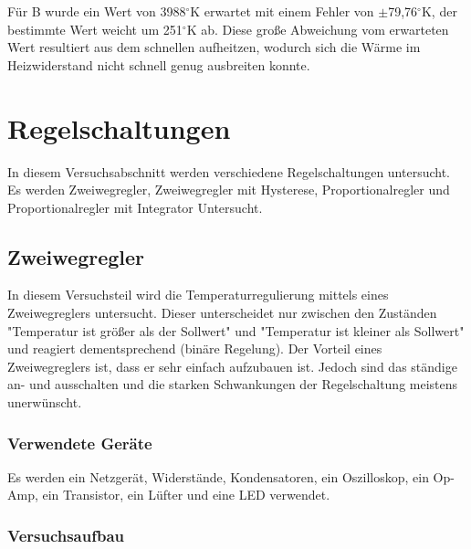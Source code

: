 \documentclass[12pt,a4paper]{article}
\begin{document}
Für B wurde ein Wert von 3988$^\circ$K erwartet mit einem Fehler von $\pm$79,76$^\circ$K, der bestimmte Wert weicht um 251$^\circ$K ab. Diese große Abweichung vom erwarteten Wert resultiert aus dem schnellen aufheitzen, wodurch sich die Wärme im Heizwiderstand nicht schnell genug ausbreiten konnte.


\section{Regelschaltungen}
In diesem Versuchsabschnitt werden verschiedene Regelschaltungen untersucht. Es werden Zweiwegregler, Zweiwegregler mit Hysterese, Proportionalregler und Proportionalregler mit Integrator Untersucht.

\subsection{Zweiwegregler}

In diesem Versuchsteil wird die Temperaturregulierung mittels eines Zweiwegreglers untersucht. Dieser unterscheidet nur zwischen den Zuständen "Temperatur ist größer als der Sollwert" und "Temperatur ist kleiner als Sollwert" und reagiert dementsprechend (binäre Regelung). Der Vorteil eines Zweiwegreglers ist, dass er sehr einfach aufzubauen ist. Jedoch sind das ständige an- und ausschalten und die starken Schwankungen der Regelschaltung meistens unerwünscht.

\subsubsection*{Verwendete Geräte}

Es werden ein Netzgerät, Widerstände, Kondensatoren, ein Oszilloskop, ein Op-Amp, ein Transistor, ein Lüfter und eine LED verwendet.


\subsubsection*{Versuchsaufbau}
\end{document}
